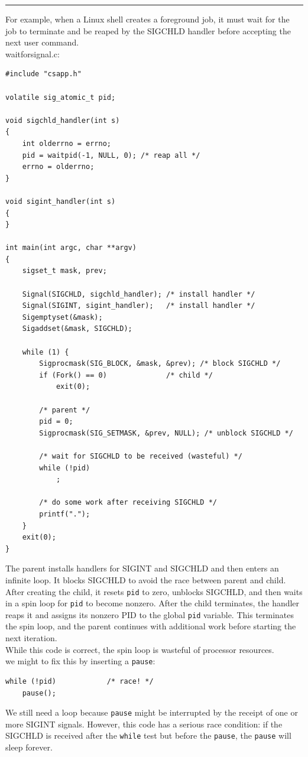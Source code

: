 \documentclass[11pt]{article}
\begin{document}
\noindent\rule{\textwidth}{0.5pt}
For example, when a Linux shell creates a foreground job, it must wait for the job to terminate and be reaped by the SIGCHLD handler before accepting the next user command.\\

waitforsignal.c:\\
\begin{verbatim}
#include "csapp.h"

volatile sig_atomic_t pid;

void sigchld_handler(int s)
{
    int olderrno = errno;
    pid = waitpid(-1, NULL, 0);	/* reap all */
    errno = olderrno;
}

void sigint_handler(int s)
{
}

int main(int argc, char **argv)
{
    sigset_t mask, prev;

    Signal(SIGCHLD, sigchld_handler); /* install handler */
    Signal(SIGINT, sigint_handler);   /* install handler */
    Sigemptyset(&mask);
    Sigaddset(&mask, SIGCHLD);

    while (1) {
        Sigprocmask(SIG_BLOCK, &mask, &prev); /* block SIGCHLD */
        if (Fork() == 0)		      /* child */
            exit(0);

        /* parent */
        pid = 0;
        Sigprocmask(SIG_SETMASK, &prev, NULL); /* unblock SIGCHLD */

        /* wait for SIGCHLD to be received (wasteful) */
        while (!pid)
            ;

        /* do some work after receiving SIGCHLD */
        printf(".");
    }
    exit(0);
}

\end{verbatim}

The parent installs handlers for SIGINT and SIGCHLD and then enters an infinite loop. It blocks SIGCHLD to avoid the race between parent and child. After creating the child, it resets \texttt{pid} to zero, unblocks SIGCHLD, and then waits in a spin loop for \texttt{pid} to become nonzero. After the child terminates, the handler reaps it and assigns its nonzero PID to the global \texttt{pid} variable. This terminates the spin loop, and the parent continues with additional work before starting the next iteration.\\

While this code is correct, the spin loop is wasteful of processor resources.\\

we might to fix this by inserting a \texttt{pause}:\\
\begin{verbatim}
while (!pid) 			/* race! */
    pause();
\end{verbatim}
We still need a loop because \texttt{pause} might be interrupted by the receipt of one or more SIGINT signals. However, this code has a serious race condition: if the SIGCHLD is received after the \texttt{while} test but before the \texttt{pause}, the \texttt{pause} will sleep forever.\\
\end{document}
